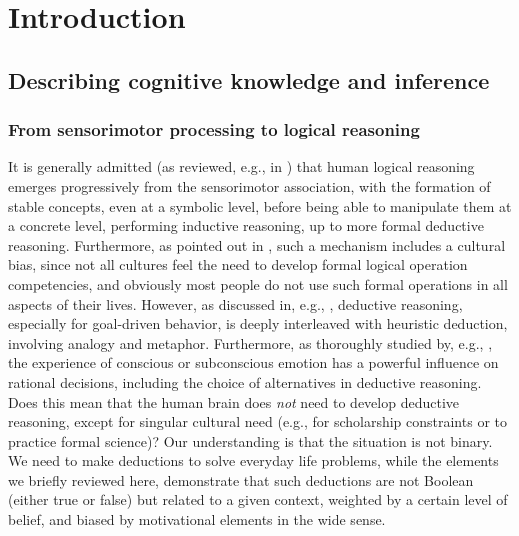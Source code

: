 \documentclass[sn-mathphys]{sn-jnl}
\begin{document}

\section{Introduction}

\subsection{Describing cognitive knowledge and inference}

\subsubsection{From sensorimotor processing to logical reasoning}

It is generally admitted (as reviewed, e.g., in \cite{ness_knowledge_2007}) that human logical reasoning emerges progressively from the sensorimotor association, with the formation of stable concepts, even at a symbolic level, before being able to manipulate them at a concrete level, performing inductive reasoning, up to more formal deductive reasoning. Furthermore, as pointed out in \cite{arnett_adolescence_2001}, such a mechanism includes a cultural bias, since not all cultures feel the need to develop formal logical operation competencies, and obviously most people do not use such formal operations in all aspects of their lives. However, as discussed in, e.g., \cite{keefer_metaphor_2016}, deductive reasoning, especially for goal-driven behavior, is deeply interleaved with heuristic deduction, involving analogy and metaphor. Furthermore, as thoroughly studied by, e.g., \cite{purves_interplay_2001}, the experience of conscious or subconscious emotion has a powerful influence on rational decisions, including the choice of alternatives in deductive reasoning. Does this mean that the human brain does {\em not} need to develop deductive reasoning, except for singular cultural need (e.g., for scholarship constraints or to practice formal science)? Our understanding is that the situation is not binary. We need to make deductions to solve everyday life problems, while the elements we briefly reviewed here, demonstrate that such deductions are not Boolean (either true or false) but related to a given context, weighted by a certain level of belief, and biased by motivational elements in the wide sense.
\end{document}
